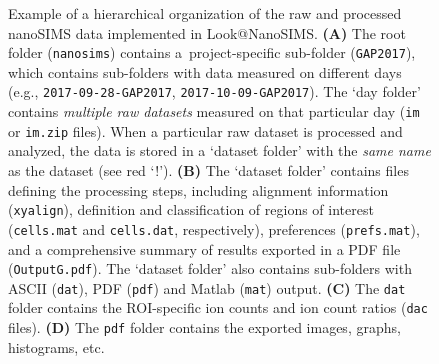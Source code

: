 \documentclass[a4paper, 11pt]{article}
\newcommand{\ttt}[1]{\texttt{#1}}
\begin{document}
\begin{figure} [t!]
    \captionsetup{labelformat=adja-page}
    \ContinuedFloat
    \caption[Figure]{%
    Example of a hierarchical organization of the raw and processed nanoSIMS data implemented in Look@NanoSIMS. %
    \textbf{(A)} The root folder (\ttt{nanosims}) contains a~project-specific sub-folder (\ttt{GAP2017}), which contains sub-folders with data measured on different days (e.g., \ttt{2017-09-28-GAP2017}, \ttt{2017-10-09-GAP2017}). %
    The `day folder' contains \emph{multiple raw datasets} measured on that particular day (\ttt{im} or \ttt{im.zip} files). %
    When a particular raw dataset is processed and analyzed, the data is stored in a `dataset folder' with the \emph{same name} as the dataset (see red `!'). %
    \textbf{(B)} The `dataset folder' contains files defining the processing steps, including alignment information (\ttt{xyalign}), definition and classification of regions of interest (\ttt{cells.mat} and \ttt{cells.dat}, respectively), preferences (\ttt{prefs.mat}), and a comprehensive summary of results exported in a PDF file (\ttt{OutputG.pdf}). %
    The `dataset folder' also contains sub-folders with ASCII (\ttt{dat}), PDF (\ttt{pdf}) and Matlab (\ttt{mat}) output. %
    \textbf{(C)} The \ttt{dat} folder contains the ROI-specific ion counts and ion count ratios (\ttt{dac} files). %
    \textbf{(D)} The \ttt{pdf} folder contains the exported images, graphs, histograms, etc. }
    \label{fig2:data_organization}
\end{figure}
\end{document}
